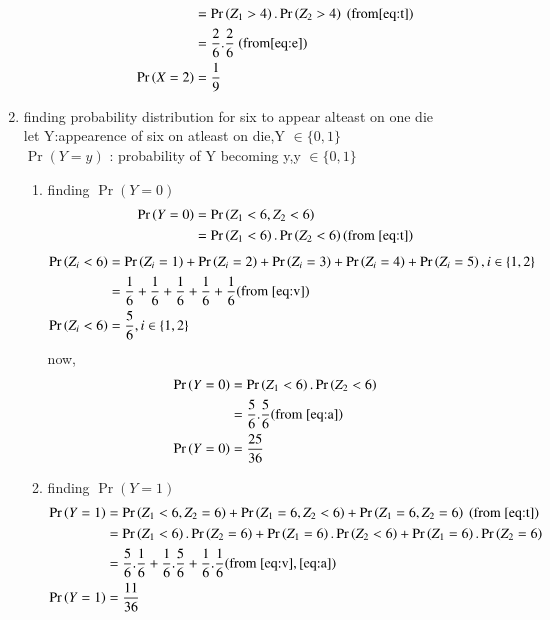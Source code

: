 \documentclass[journal,12pt,onecolumn]{IEEEtran}
\providecommand{\pr}[1]{\ensuremath{\Pr\left(#1\right)}}
\theoremstyle{remark}
\begin{document}
\begin{enumerate}
\begin{enumerate}
\begin{align}
&=\pr{Z_1>4}.\pr{Z_2>4}\  (\text{from} \eqref{eq:t})\\
&= \frac{2}{6}.\frac{2}{6} \ (\text{from} \eqref{eq:e})\\
\pr{X=2}&=\frac{1}{9}
\end{align}
\end{enumerate}
\item finding probability distribution for six to appear alteast on one die\\
let Y:appearence of six on atleast on die,Y $\in \{ 0,1\}$ \\
$\pr{Y=y}$ : probability of Y becoming y,y $\in \{ 0,1\}$
\begin{enumerate}
\item finding $\pr{Y=0}$
\begin{align}
\pr{Y=0}&=\pr{Z_1<6,Z_2<6}\\
&=\pr{Z_1<6}.\pr{Z_2<6} (\text{from } \eqref{eq:t})
\end{align}
\begin{align}
\pr{Z_i<6}&=\pr{Z_i=1}+\pr{Z_i=2}+\pr{Z_i=3}+\pr{Z_i=4}+\pr{Z_i=5} ,i\in \{1,2\}
\\
&=\frac{1}{6}+\frac{1}{6}+\frac{1}{6}+\frac{1}{6}+\frac{1}{6} (\text{from } \eqref{eq:v}) \\
\pr{Z_i<6}&=\frac{5}{6} ,i\in \{1,2\}\label{eq:a}
\end{align}
now,
\begin{align}
\pr{Y=0}&=\pr{Z_1<6}.\pr{Z_2<6}\\
&=\frac{5}{6}.\frac{5}{6}  (\text{from } \eqref{eq:a})\\
\pr{Y=0}&=\frac{25}{36}
\end{align}
\item finding $\pr{Y=1}$
\begin{align}
\pr{Y=1}&=\pr{Z_1<6,Z_2=6}+\pr{Z_1=6,Z_2<6}+\pr{Z_1=6,Z_2=6} \  (\text{from } \eqref{eq:t})\\
&=\pr{Z_1<6}.\pr{Z_2=6}+\pr{Z_1=6}.\pr{Z_2<6}+\pr{Z_1=6}.\pr{Z_2=6}\\
&=\frac{5}{6}.\frac{1}{6}+\frac{1}{6}.\frac{5}{6}+\frac{1}{6}.\frac{1}{6}  (\text{from }\eqref{eq:v},\eqref{eq:a})\\
\pr{Y=1}&=\frac{11}{36}
\end{align}
\end{enumerate}
\end{enumerate}
\end{document}

